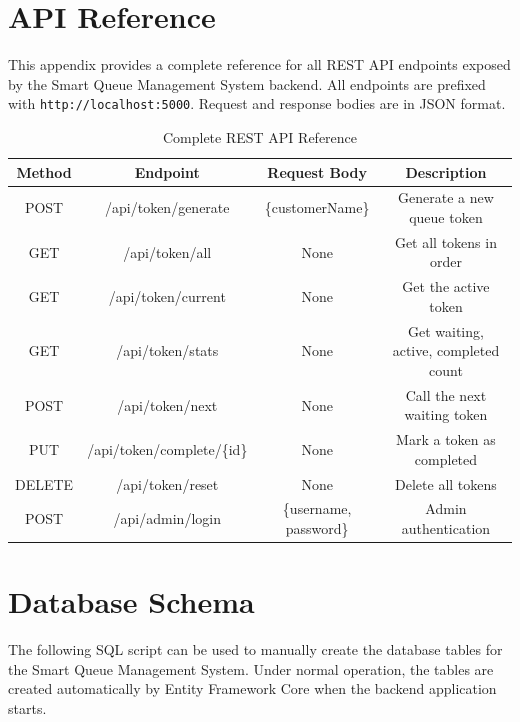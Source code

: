 
\appendix
\chapter{API Reference}

This appendix provides a complete reference for all REST API endpoints exposed by the Smart Queue Management System backend. All endpoints are prefixed with \texttt{http://localhost:5000}. Request and response bodies are in JSON format.

\begin{table}[htbp]
    \centering
    \begin{tabular}{|c|c|c|c|}
        \hline
        \textbf{Method} & \textbf{Endpoint} & \textbf{Request Body} & \textbf{Description} \\
        \hline
        POST & /api/token/generate & \{customerName\} & Generate a new queue token \\
        \hline
        GET & /api/token/all & None & Get all tokens in order \\
        \hline
        GET & /api/token/current & None & Get the active token \\
        \hline
        GET & /api/token/stats & None & Get waiting, active, completed count \\
        \hline
        POST & /api/token/next & None & Call the next waiting token \\
        \hline
        PUT & /api/token/complete/\{id\} & None & Mark a token as completed \\
        \hline
        DELETE & /api/token/reset & None & Delete all tokens \\
        \hline
        POST & /api/admin/login & \{username, password\} & Admin authentication \\
        \hline
    \end{tabular}
    \caption{Complete REST API Reference}
    \label{tab:apiref}
\end{table}

\chapter{Database Schema}

The following SQL script can be used to manually create the database tables for the Smart Queue Management System. Under normal operation, the tables are created automatically by Entity Framework Core when the backend application starts.

